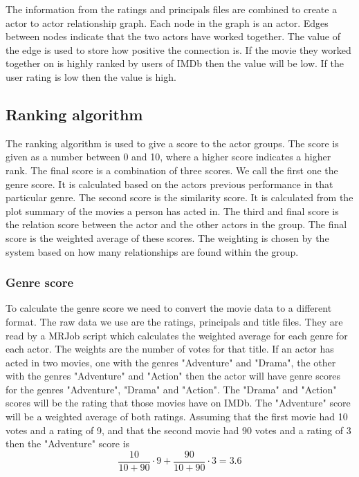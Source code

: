 The information from the ratings and principals files are combined to create a actor to actor relationship graph. Each node in the graph is an actor. Edges between nodes indicate that the two actors have worked together. The value of the edge is used to store how positive the connection is. If the movie they worked together on is highly ranked by users of IMDb then the value will be low. If the user rating is low then the value is high. 



\subsection{Ranking algorithm}

The ranking algorithm is used to give a score to the actor groups. The score is given as a number between 0 and 10, where a higher score indicates a higher rank. The final score is a combination of three scores. We call the first one the genre score. It is calculated based on the actors previous performance in that particular genre. The second score is the similarity score. It is calculated from the plot summary of the movies a person has acted in. The third and final score is the relation score between the actor and the other actors in the group. The final score is the weighted average of these scores. The weighting is chosen by the system based on how many relationships are found within the group.



\subsubsection{Genre score}

To calculate the genre score we need to convert the movie data to a different format. The raw data we use are the ratings, principals and title files. They are read by a MRJob script which calculates the weighted average for each genre for each actor. The weights are the number of votes for that title. If an actor has acted in two movies, one with the genres "Adventure" and "Drama", the other with the genres "Adventure" and "Action" then the actor will have genre scores for the genres "Adventure", "Drama" and "Action". The "Drama" and "Action" scores will be the rating that those movies have on IMDb. The "Adventure" score will be a weighted average of both ratings. Assuming that the first movie had 10 votes and a rating of 9, and that the second movie had 90 votes and a rating of 3 then the "Adventure" score is $$\frac{10}{10+90}\cdot9+\frac{90}{10+90}\cdot3=3.6$$


